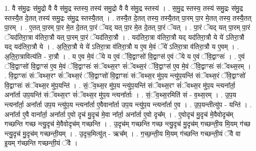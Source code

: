 \documentclass[17pt]{extarticle}
\begin{document}
1. वै स॑मु॒द्रः स॑मु॒द्रो वै वै स॑मु॒द्र स्तस्य॒ तस्य॑ समु॒द्रो वै वै स॑मु॒द्र स्तस्य॑ । . स॒मु॒द्र स्तस्य॒ तस्य॑ समु॒द्रः स॑मु॒द्र स्तस्यै॒त दे॒तत् तस्य॑ समु॒द्रः स॑मु॒द्र स्तस्यै॒तत् । . तस्यै॒त दे॒तत् तस्य॒ तस्यै॒तत् पा॒रम् पा॒र मे॒तत् तस्य॒ तस्यै॒तत् पा॒रम् । . ए॒तत् पा॒रम् पा॒र मे॒त दे॒तत् पा॒रं ॅयद् यत् पा॒र मे॒त दे॒तत् पा॒रं ॅयत् । . पा॒रं ॅयद् यत् पा॒रम् पा॒रं ॅयद॑तिरा॒त्रा व॑तिरा॒त्रौ यत् पा॒रम् पा॒रं ॅयद॑तिरा॒त्रौ । . यद॑तिरा॒त्रा व॑तिरा॒त्रौ यद् यद॑तिरा॒त्रौ ये ये॑ ऽतिरा॒त्रौ यद् यद॑तिरा॒त्रौ ये । . अ॒ति॒रा॒त्रौ ये ये॑ ऽतिरा॒त्रा व॑तिरा॒त्रौ य ए॒व मे॒वं ॅये॑ ऽतिरा॒त्रा व॑तिरा॒त्रौ य ए॒वम् । . अ॒ति॒रा॒त्रावित्य॑ति - रा॒त्रौ । . य ए॒व मे॒वं ॅये य ए॒वं ॅवि॒द्वाꣳसो॑ वि॒द्वाꣳस॑ ए॒वं ॅये य ए॒वं ॅवि॒द्वाꣳसः॑ । . ए॒वं ॅवि॒द्वाꣳसो॑ वि॒द्वाꣳस॑ ए॒व मे॒वं ॅवि॒द्वाꣳसः॑ संॅवथ्स॒रꣳ सं॑ॅवथ्स॒रं ॅवि॒द्वाꣳस॑ ए॒व मे॒वं ॅवि॒द्वाꣳसः॑ संॅवथ्स॒रम् । . वि॒द्वाꣳसः॑ संॅवथ्स॒रꣳ सं॑ॅवथ्स॒रं ॅवि॒द्वाꣳसो॑ वि॒द्वाꣳसः॑ संॅवथ्स॒र मु॑प॒य न्त्यु॑प॒यन्ति॑ संॅवथ्स॒रं ॅवि॒द्वाꣳसो॑ वि॒द्वाꣳसः॑ संॅवथ्स॒र मु॑प॒यन्ति॑ । . सं॒ॅव॒थ्स॒र मु॑प॒य न्त्यु॑प॒यन्ति॑ संॅवथ्स॒रꣳ सं॑ॅवथ्स॒र मु॑प॒य न्त्यना᳚र्ता॒ अना᳚र्ता उप॒यन्ति॑ संॅवथ्स॒रꣳ सं॑ॅवथ्स॒र मु॑प॒य न्त्यना᳚र्ताः । . सं॒ॅव॒थ्स॒रमिति॑ सं - व॒थ्स॒रम् । . उ॒प॒य न्त्यना᳚र्ता॒ अना᳚र्ता उप॒य न्त्यु॑प॒य न्त्यना᳚र्ता ए॒वैवाना᳚र्ता उप॒य न्त्यु॑प॒य न्त्यना᳚र्ता ए॒व । . उ॒प॒यन्तीत्यु॑प - यन्ति॑ । . अना᳚र्ता ए॒वै वाना᳚र्ता॒ अना᳚र्ता ए॒वो दृच॑ मु॒दृच॑ मे॒वा ना᳚र्ता॒ अना᳚र्ता ए॒वो दृच᳚म् । . ए॒वोदृच॑ मु॒दृच॑ मे॒वैवोदृच॑म् गच्छन्ति गच्छ न्त्यु॒दृच॑ मे॒वैवोदृच॑म् गच्छन्ति । . उ॒दृच॑म् गच्छन्ति गच्छ न्त्यु॒दृच॑ मु॒दृच॑म् गच्छन्ती॒य मि॒यम् ग॑च्छ न्त्यु॒दृच॑ मु॒दृच॑म् 
गच्छन्ती॒यम् । . उ॒दृच॒मित्यु॑त् - ऋच᳚म् । . ग॒च्छ॒न्ती॒य मि॒यम् ग॑च्छन्ति गच्छन्ती॒यं ॅवै वा इ॒यम् ग॑च्छन्ति गच्छन्ती॒यं ॅवै । \newline
\end{document}
